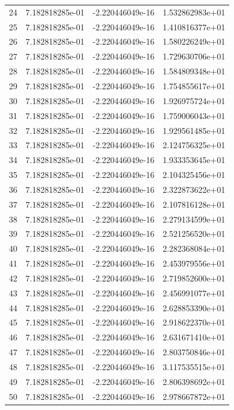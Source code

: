 \documentclass{article}
\begin{document}
\begin{table}[htb]
\begin{tabular}{c c c c}
24 & 7.182818285e-01 & -2.220446049e-16 & 1.532862983e+01 \\
25 & 7.182818285e-01 & -2.220446049e-16 & 1.410816377e+01 \\
26 & 7.182818285e-01 & -2.220446049e-16 & 1.580226249e+01 \\
27 & 7.182818285e-01 & -2.220446049e-16 & 1.729630706e+01 \\
28 & 7.182818285e-01 & -2.220446049e-16 & 1.584809348e+01 \\
29 & 7.182818285e-01 & -2.220446049e-16 & 1.754855617e+01 \\
30 & 7.182818285e-01 & -2.220446049e-16 & 1.926975724e+01 \\
31 & 7.182818285e-01 & -2.220446049e-16 & 1.759006043e+01 \\
32 & 7.182818285e-01 & -2.220446049e-16 & 1.929561485e+01 \\
33 & 7.182818285e-01 & -2.220446049e-16 & 2.124756325e+01 \\
34 & 7.182818285e-01 & -2.220446049e-16 & 1.933353645e+01 \\
35 & 7.182818285e-01 & -2.220446049e-16 & 2.104325456e+01 \\
36 & 7.182818285e-01 & -2.220446049e-16 & 2.322873622e+01 \\
37 & 7.182818285e-01 & -2.220446049e-16 & 2.107816128e+01 \\
38 & 7.182818285e-01 & -2.220446049e-16 & 2.279134599e+01 \\
39 & 7.182818285e-01 & -2.220446049e-16 & 2.521256520e+01 \\
40 & 7.182818285e-01 & -2.220446049e-16 & 2.282368084e+01 \\
41 & 7.182818285e-01 & -2.220446049e-16 & 2.453979556e+01 \\
42 & 7.182818285e-01 & -2.220446049e-16 & 2.719852600e+01 \\
43 & 7.182818285e-01 & -2.220446049e-16 & 2.456991077e+01 \\
44 & 7.182818285e-01 & -2.220446049e-16 & 2.628853390e+01 \\
45 & 7.182818285e-01 & -2.220446049e-16 & 2.918622370e+01 \\
46 & 7.182818285e-01 & -2.220446049e-16 & 2.631671410e+01 \\
47 & 7.182818285e-01 & -2.220446049e-16 & 2.803750846e+01 \\
48 & 7.182818285e-01 & -2.220446049e-16 & 3.117535515e+01 \\
49 & 7.182818285e-01 & -2.220446049e-16 & 2.806398692e+01 \\
50 & 7.182818285e-01 & -2.220446049e-16 & 2.978667872e+01 \\\hline %
\end{tabular}
\end{table}
\end{document}
